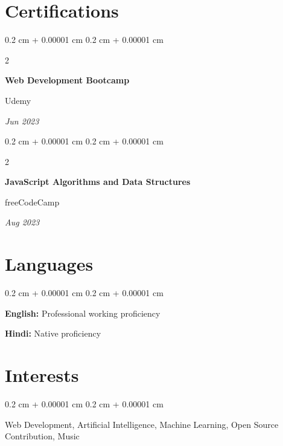 \documentclass[10pt, letterpaper]{article}
\newenvironment{onecolentry}{ 
    \begin{adjustwidth}{ 
        0.2 cm + 0.00001 cm 
    }{ 
        0.2 cm + 0.00001 cm 
    } 
}{ 
    \end{adjustwidth} 
} %
\newenvironment{twocolentry}[2][]{ 
    \onecolentry 
    \def\secondColumn{#2} 
    \setcolumnwidth{\fill, 4.5 cm} 
    \begin{paracol}{2} 
}{ 
    \switchcolumn \raggedleft \secondColumn 
    \end{paracol} 
    \endonecolentry 
} %
\begin{document}
    \section{Certifications}
        \begin{twocolentry}{
        \textit{Jun 2023}}
            \textbf{Web Development Bootcamp}
            
            Udemy
        \end{twocolentry}
        
        \begin{twocolentry}{
        \textit{Aug 2023}}
            \textbf{JavaScript Algorithms and Data Structures}
            
            freeCodeCamp
        \end{twocolentry}

    \section{Languages}
        \begin{onecolentry}
            \textbf{English:} Professional working proficiency
            
            \textbf{Hindi:} Native proficiency
        \end{onecolentry}

    \section{Interests}
        \begin{onecolentry}
            Web Development, Artificial Intelligence, Machine Learning, Open Source Contribution, Music
        \end{onecolentry}
\end{document}
